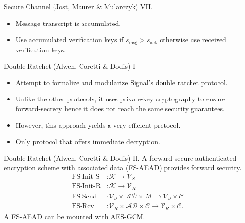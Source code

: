 \documentclass{beamer}
\renewcommand{\t}{\text}
\begin{document}
\begin{frame}{Secure Channel (Jost, Maurer \& Mularczyk) VII.}
  \scriptsize
  \begin{figure}[ht]
     \centering
     \setlength{\fboxsep}{10pt}
     \scalebox{0.55}{%
       \fbox{%
         
       }
     }
  \end{figure}
  \begin{itemize}
  \item Message transcript is accumulated.
  \item Use accumulated verification keys if $s_\t{msg} > s_\t{ack}$ otherwise
    use received verification keys.
  \end{itemize}
\end{frame}

\begin{frame}{Double Ratchet (Alwen, Coretti \& Dodis) I.}
  \begin{itemize}
  \item Attempt to formalize and modularize Signal's double ratchet protocol.
  \item Unlike the other protocols, it uses private-key cryptography to ensure
    forward-secrecy hence it does not reach the same security guarantees.
  \item However, this approach yields a very efficient protocol.
  \item Only protocol that offers immediate decryption.
  \end{itemize}
\end{frame}

\begin{frame}{Double Ratchet (Alwen, Coretti \& Dodis) II.}
  A forward-secure authenticated encryption scheme with associated data (FS-AEAD)
  provides forward security.
  \begin{align*}
    \t{FS-Init-S} & : \mathcal{K} \rightarrow \mathcal{V}_S \\
    \t{FS-Init-R} & : \mathcal{K} \rightarrow \mathcal{V}_R \\
    \t{FS-Send} & : \mathcal{V}_S \times \mathcal{AD} \times \mathcal{M}
                                \rightarrow \mathcal{V}_S \times \mathcal{C} \\
    \t{FS-Rcv} & : \mathcal{V}_R \times \mathcal{AD} \times \mathcal{C}
                                \rightarrow \mathcal{V}_R \times \mathcal{C}.
  \end{align*}
  A FS-AEAD can be mounted with AES-GCM.
\end{frame}
\end{document}
